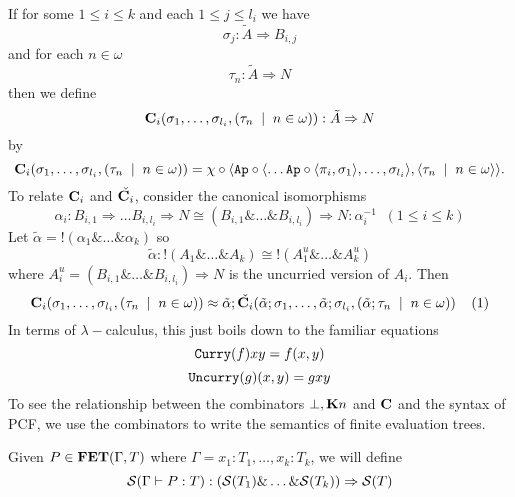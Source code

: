 \documentclass[11pt]{article}
\newcommand{\with}{\mbox{$\&$}}
\newcommand{\lang}{\langle}
\newcommand{\rang}{\rangle}
\begin{document}
If for some $1\leq i\leq k$ and each $1\leq j\leq l_i$ we have
$$\sigma_j:\tilde{A}\Rightarrow B_{i,j}$$
and for each $n\in\omega$
$$\tau_n:\tilde{A}\Rightarrow N$$
then we define
$${\bf C}_i(\sigma_1,\dots,\sigma_{l_i},(\tau_n\;\mid \;
n\in\omega)):\tilde{A}\Rightarrow N$$
by
$${\bf C}_i(\sigma_1,\dots,\sigma_{l_i},(\tau_n\;\mid \; n\in\omega))=
\chi\circ\lang {\tt Ap }\circ\lang \dots
{\tt Ap }\circ\lang \pi_i,\sigma_1\rang ,\dots,\sigma_{l_i}\rang ,\lang \tau_n\;\mid \;
n\in\omega\rang \rang .$$
To relate ${\bf C}_i$ and $\check{{\bf C}_i}$, consider the canonical isomorphisms
$$\alpha_i: B_{i,1}\Rightarrow\dots B_{i,l_i}\Rightarrow N\cong
(B_{i,1}\with\dots\with B_{i,l_i})\Rightarrow N:\alpha_i^{-1} \;\;
(1\leq i\leq k)$$
Let $\tilde{\alpha}=!(\alpha_1\with\dots\with \alpha_k)$ so
$$\tilde{\alpha}:!(A_1\with\dots\with A_k)\cong !(A_1^u\with\dots\with
A_k^u)$$
where $A_i^u=(B_{i,1}\with\dots\with B_{i,l_i})\Rightarrow N$ is the
uncurried version of $A_i$.
Then
$${\bf C}_i(\sigma_1,\dots,\sigma_{l_i},(\tau_n\;\mid \; n\in\omega))\approx
\tilde{\alpha};\check{{\bf C}_i}(\tilde{\alpha};\sigma_1,\dots,\tilde{\alpha};
\sigma_{l_i},(\tilde{\alpha};\tau_n\;\mid \; n\in\omega)) \;\;\;\;(1)$$
In terms of $\lambda-$calculus, this just boils down to the familiar
equations
$${\tt Curry}(f)xy=f(x,y)$$
$${\tt Uncurry}(g)(x,y)=gxy$$
To see the relationship between the combinators $\bot, {\bf K}n$ and
$\bf C$ and
the syntax of PCF, we use the combinators to write the semantics of
finite evaluation trees.

\newcommand{\sem}[1]{{\cal S}( #1)}
Given $P\in {\bf FET}(\Gamma,T)$ where $\Gamma=x_1:T_1,\dots,x_k:T_k$, we
will define
$$\sem{ \Gamma\vdash P:T
  }:(\sem{T_1}\with\dots\with\sem{T_k})\Rightarrow \sem{T}$$
\end{document}
